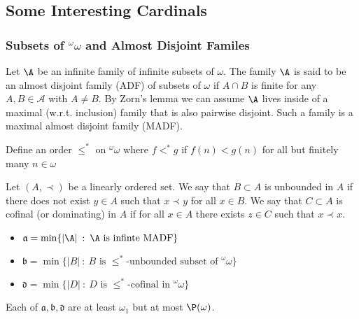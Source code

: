 \documentclass{article}
\begin{document}
\subsection{Some Interesting Cardinals}
\subsubsection{Subsets of $^\omega\omega$ and Almost Disjoint Familes}

\begin{defn}
    Let \(\A\) be an infinite family of infinite subsets of \(\omega\). The family \(\A\) is said to be an almost disjoint family (ADF) of subsets of \(\omega\) if \(A \cap B \) is finite for any \(A,B \in \mathcal{A}\) with \(A \ne B\). By Zorn's lemma we can assume \(\A\) lives inside of a maximal (w.r.t. inclusion) family that is also pairwise disjoint. Such a family is a maximal almost disjoint family (MADF).
\end{defn}
\begin{defn}
    Define an order \(\leq^{\ast}\) on \(^\omega\omega\) where \(f <^{\ast} g\) if \(f(n) < g(n)\) for all but finitely many \(n \in  \omega\)
\end{defn}
\begin{defn}
    Let \((A, \prec)\) be a linearly ordered set. We say that  \(B \subset A\) is unbounded in \(A\) if there does not exist \(y \in A\) such that \(x \prec y\) for all \(x \in B\). We say that \(C \subset A\) is cofinal (or dominating) in \(A\) if for all \(x \in A\) there exists \(z \in C\) such that \(x \prec x\).
\end{defn}
\begin{defn}
    \leavevmode
    \begin{itemize}
        \item \(\mathfrak{a} = \min\{|\A| \: : \: \A \text{ is infinte } \text{MADF}\}\)
        \item \(\mathfrak{b} = \min\{|B| \: : \: B \text{ is } \leq^{\ast}\text{-unbounded subset of }^\omega\omega\}\)
        \item \(\mathfrak{d} = \min\{|D| \: : \: D \text{ is } \leq^{\ast}\text{-cofinal in } ^\omega\omega
        \}\)
    \end{itemize}
    Each of \(\mathfrak{a}, \mathfrak{b}, \mathfrak{d}\) are at least \(\omega_1\) but at most \(\P(\omega)\).
\end{defn}
\end{document}
